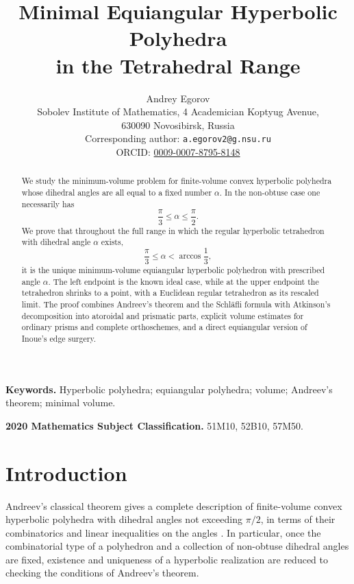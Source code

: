 \documentclass[12pt,a4paper]{article}
\theoremstyle{definition}
\begin{document}
\title{Minimal Equiangular Hyperbolic Polyhedra\\
in the Tetrahedral Range}
\author{Andrey Egorov\\
Sobolev Institute of Mathematics, 4 Academician Koptyug Avenue,\\
630090 Novosibirsk, Russia\\
Corresponding author: \texttt{a.egorov2@g.nsu.ru}\\
ORCID: \href{https://orcid.org/0009-0007-8795-8148}{0009-0007-8795-8148}}
\date{}
\maketitle

\begin{abstract}
We study the minimum-volume problem for finite-volume convex hyperbolic polyhedra whose dihedral angles are all equal to a fixed number \(\alpha\). In the non-obtuse case one necessarily has
\[
\frac{\pi}{3}\le \alpha\le \frac{\pi}{2}.
\]
We prove that throughout the full range in which the regular hyperbolic tetrahedron with dihedral angle \(\alpha\) exists,
\[
\frac{\pi}{3}\le \alpha<\arccos\frac13,
\]
it is the unique minimum-volume equiangular hyperbolic polyhedron with prescribed angle \(\alpha\). The left endpoint is the known ideal case, while at the upper endpoint the tetrahedron shrinks to a point, with a Euclidean regular tetrahedron as its rescaled limit. The proof combines Andreev's theorem and the Schl\"afli formula with Atkinson's decomposition into atoroidal and prismatic parts, explicit volume estimates for ordinary prisms and complete orthoschemes, and a direct equiangular version of Inoue's edge surgery.
\end{abstract}

\noindent\textbf{Keywords.} Hyperbolic polyhedra; equiangular polyhedra; volume; Andreev's theorem; minimal volume.

\medskip
\noindent\textbf{2020 Mathematics Subject Classification.} 51M10, 52B10, 57M50.


\section{Introduction}

Andreev's classical theorem gives a complete description of finite-volume convex hyperbolic polyhedra with dihedral angles not exceeding \(\pi/2\), in terms of their combinatorics and linear inequalities on the angles \cite{AndreevCompact,AndreevFinite,RHD}. In particular, once the combinatorial type of a polyhedron and a collection of non-obtuse dihedral angles are fixed, existence and uniqueness of a hyperbolic realization are reduced to checking the conditions of Andreev's theorem.
\end{document}
